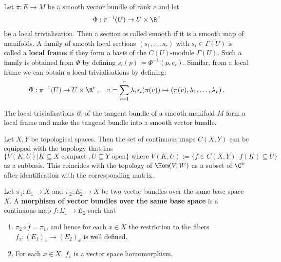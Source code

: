 \begin{definition}\label{def:vb-framesFromTrivialisations}
Let $\pi:E\to M$ be a smooth vector bundle of rank $r$ and let 
\begin{equation*}
	\Phi: \pi^{-1}(U) \to U\times \R^r
\end{equation*} be a local trivialisation.
Then a section is called smooth if it is a smooth map of manifolds. A family of smooth local sections $(s_1,\dots, s_r)$ with $s_i\in \Gamma(U)$ is called a \textbf{local frame} if they form a basis of the $C(U)$-module $\Gamma(U)$. Such a family is obtained from $\Phi$ by defining $s_i(p)\coloneq \Phi^{-1}(p,e_i)$. Similar, from a local frame we can obtain a local trivialisations by defining:
\begin{equation*}
	\Phi: \pi^{-1}(U) \to U\times \R^r\,,\quad v=\sum_{i=1}^{r} \lambda_i s_i(\pi(v)) \mapsto (\pi(v),\lambda_1,\dots, \lambda_r)\,.
\end{equation*}
\end{definition}
\begin{example}
The local trivialisations $\partial_i$ of the tangent bundle of a smooth manifold $M$ form a local frame and make the tangend bundle into a smooth vector bundle.
\end{example}

\begin{definition}
	Let $X,Y$ be topological spaces. Then the set of continuous maps $C(X,Y)$ can be equipped with the topology that has 
	\begin{equation*}
		\{V(K,U)|K\subseteq X \text{ compact }, U\subseteq Y \text{ open}\} \text{ where }V(K,U):=\{f\in C(X,Y) |~f(K)\subseteq U\}
	\end{equation*} as a subbasis. This coincides with the topology of $\Hom(V,W)$ as a subset of $\C^n$ after identification with the corresponding matrix.
\end{definition}

\begin{definition}
	Let $\pi_1:E_1\to X$ and $\pi_2:E_2\to X$ be two vector bundles over the same base space $X$. A \textbf{morphism of vector bundles over the same base space} is a continuous map $f:E_1\to E_2$ such that
	\begin{enumerate}
		\item $\pi_2\circ f=\pi_1$, and hence for each $x\in X$ the restriction to the fibers $f_x:(E_1)_x \to( E_2)_x$ is well defined. 
		\item For each $x\in X$, $f_x$ is a vector space homomorphism.
	\end{enumerate} 
\end{definition}

